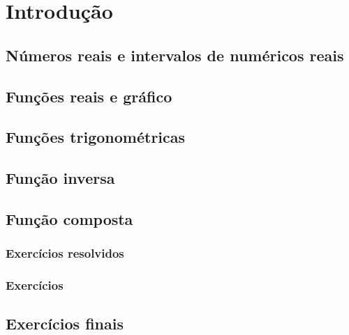 
\chapter{Introdução}\label{chap:introducao}


\section{Números reais e intervalos de numéricos reais}\label{sec:intro_reais}
\construirSec

\section{Funções reais e gráfico}\label{sec:intro_fun_reais}
\construirSec

\section{Funções trigonométricas}\label{sec:intro_trigo}
\construirSec

\section{Função inversa}\label{sec:intro_inversa}
\construirSec

\section{Função composta}\label{sec:intro_composta}
\construirSec


\subsection*{Exercícios resolvidos}

\construirExeresol

\subsection*{Exercícios}

\construirExer

\section{Exercícios finais}

\construirExer
